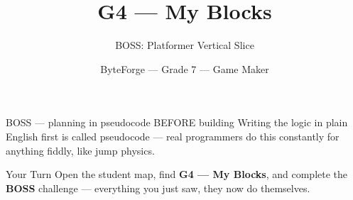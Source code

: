 \documentclass[aspectratio=169]{beamer}
\title{G4 — My Blocks}
\subtitle{BOSS: Platformer Vertical Slice}
\author{ByteForge --- Grade 7 --- Game Maker}
\date{}
\begin{document}
\begin{frame}
    \titlepage
\end{frame}

\begin{frame}{BOSS — planning in pseudocode BEFORE building}
    \Large
    Writing the logic in plain English first is called pseudocode — real programmers do this constantly for anything fiddly, like jump physics.
\end{frame}

\begin{frame}{Your Turn}
    \Large
    Open the student map, find \textbf{G4 — My Blocks}, and complete
    the \textbf{BOSS} challenge --- everything you just saw, they now do themselves.
\end{frame}
\end{document}

